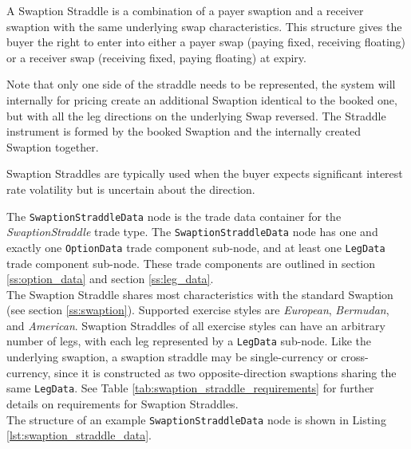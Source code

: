 A Swaption Straddle is a combination of a payer swaption and a receiver swaption with the same underlying swap characteristics. This structure gives the buyer the right to enter 
into either a payer swap (paying fixed, receiving floating) or a receiver swap (receiving fixed, paying floating) at expiry. 

Note that only one side of the straddle needs to be represented,
the system will internally for pricing create an additional Swaption identical to the booked one, but with all the leg directions on the underlying Swap reversed. The Straddle instrument is formed by the booked Swaption and the internally created Swaption together.

Swaption Straddles are typically used when the buyer expects significant interest rate volatility but is uncertain about the direction.

The \lstinline!SwaptionStraddleData! node is the trade data container for the \emph{SwaptionStraddle} trade type. The \lstinline!SwaptionStraddleData! node has one and exactly one \lstinline!OptionData! trade component sub-node, and at least one \lstinline!LegData! trade component sub-node. These trade components are outlined in section \ref{ss:option_data} and section \ref{ss:leg_data}.\\
\vspace{5mm}
The Swaption Straddle shares most characteristics with the standard Swaption (see section \ref{ss:swaption}). Supported exercise styles are \emph{European}, \emph{Bermudan}, 
and \emph{American}. Swaption Straddles of all exercise styles can have an arbitrary number of legs, with each leg represented by a \lstinline!LegData! sub-node. 
Like the underlying swaption, a swaption straddle may be single-currency or cross-currency, since it is constructed as two opposite-direction swaptions sharing the same \lstinline!LegData!. 
See Table \ref{tab:swaption_straddle_requirements} for further details on requirements for Swaption Straddles.\\
\vspace{5mm}
The structure of an example \lstinline!SwaptionStraddleData! node is shown in Listing \ref{lst:swaption_straddle_data}.

